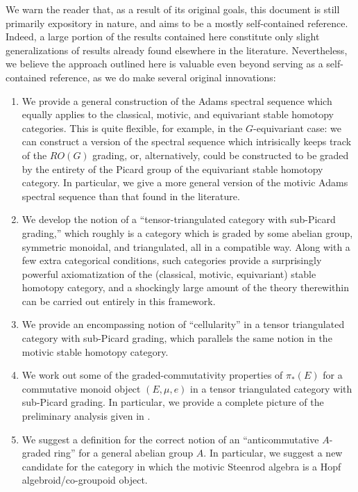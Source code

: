 \documentclass[../main.tex]{subfiles}
\begin{document}
We warn the reader that, as a result of its original goals, this document is still primarily expository in nature, and aims to be a mostly self-contained reference. Indeed, a large portion of the results contained here constitute only slight generalizations of results already found elsewhere in the literature. Nevertheless, we believe the approach outlined here is valuable even beyond serving as a self-contained reference, as we do make several original innovations:
\begin{enumerate}
    \item We provide a general construction of the Adams spectral sequence which equally applies to the classical, motivic, and equivariant stable homotopy categories. This is quite flexible, for example, in the $G$-equivariant case: we can construct a version of the spectral sequence which intrisically keeps track of the $RO(G)$ grading, or, alternatively, could be constructed to be graded by the entirety of the Picard group of the equivariant stable homotopy category. In particular, we give a more general version of the motivic Adams spectral sequence than that found in the literature.
    \item We develop the notion of a ``tensor-triangulated category with sub-Picard grading,'' which roughly is a category which is graded by some abelian group, symmetric monoidal, and triangulated, all in a compatible way. Along with a few extra categorical conditions, such categories provide a surprisingly powerful axiomatization of the (classical, motivic, equivariant) stable homotopy category, and a shockingly large amount of the theory therewithin can be carried out entirely in this framework.
    \item We provide an encompassing notion of ``cellularity'' in a tensor triangulated category with sub-Picard grading, which parallels the same notion in the motivic stable homotopy category.
    \item We work out some of the graded-commutativity properties of $\pi_*(E)$ for a commutative monoid object $(E,\mu,e)$ in a tensor triangulated category with sub-Picard grading. In particular, we provide a complete picture of the preliminary analysis given in \cite[Remark 7.2]{Dugger_2014}.
    \item We suggest a definition for the correct notion of an ``anticommutative $A$-graded ring'' for a general abelian group $A$. In particular, we suggest a new candidate for the category in which the motivic Steenrod algebra is a Hopf algebroid/co-groupoid object.
\end{enumerate}
\end{document}
